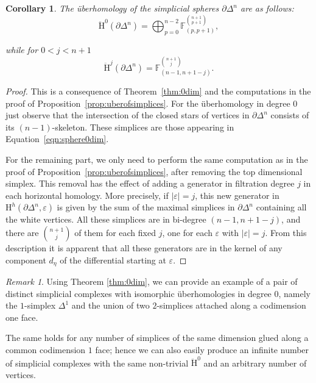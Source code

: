 \documentclass[11pt, a4paper, reqno, twoside, makeidx]{amsart}
\theoremstyle{remark}
\newtheorem{rmk}{Remark}[section]
\theoremstyle{plain}
\newtheorem{cor}[thm]{Corollary}
\theoremstyle{definition}
\newcommand{\F}{\mathbb{F}}
\newcommand{\HH}{\mathrm{H}}
\newcommand{\uH}{\ddot{\mathrm{H}}}
\begin{document}
\begin{cor}\label{cor:uberofspheres}
The \"uberhomology of the simplicial spheres $\partial \Delta^n$ are as follows:
\begin{equation}\label{eqn:sphere0dim}
\uH^0 (\partial\Delta^n) = \bigoplus_{p = 0}^{n-2} \F^{\binom{n+1}{p+1}}_{(p, p+1)},
\end{equation}

while for $0<j<n+1$ 
\begin{equation}\label{eqn:sphereotherdim}
\uH^j (\partial\Delta^n) =  \F^{\binom{n+1}{j}}_{(n-1, n+1-j)}.
\end{equation}
\end{cor}
\begin{proof}
This is a consequence of Theorem~\ref{thm:0dim} and the computations in the proof of Proposition~\ref{prop:uberofsimplices}. For the \"uberhomology in degree $0$ just observe that the intersection of the closed stars of vertices in $\partial\Delta^n$ consists of its $(n-1)$-skeleton. These simplices are those appearing in Equation~\eqref{eqn:sphere0dim}.

For the remaining part, we only need to perform the same computation as in the proof of Proposition~\ref{prop:uberofsimplices}, after removing the top dimensional simplex. This removal has the effect of adding a generator in filtration degree $j$ in each horizontal homology. More precisely, if $|\varepsilon|=j$, this new generator in $\HH^h(\partial \Delta^n, \varepsilon)$ is given by the sum of the maximal simplices in $\partial \Delta^n$ containing all the white vertices. All these simplices are in bi-degree $(n-1,n+1-j)$, and there are $\binom{n+1}{j}$ of them for each fixed $j$, one for each $\varepsilon$ with $|\varepsilon| = j$. 
From this description it is apparent that all these generators are in the kernel of any component $d_\eta$ of the differential starting at $\varepsilon$.
\end{proof}


\begin{rmk}
Using Theorem \ref{thm:0dim}, we can provide an example of a pair of distinct simplicial complexes with isomorphic \"uberhomologies in degree $0$, namely the $1$-simplex $\Delta^1$ and the union of two $2$-simplices attached along a codimension one face. 

The same holds for any number of simplices of the same dimension glued along a common codimension $1$ face; hence we can also easily produce an infinite number of simplicial complexes with the same non-trivial $\uH^0$ and an arbitrary number of vertices.
\end{rmk} 
\end{document}
